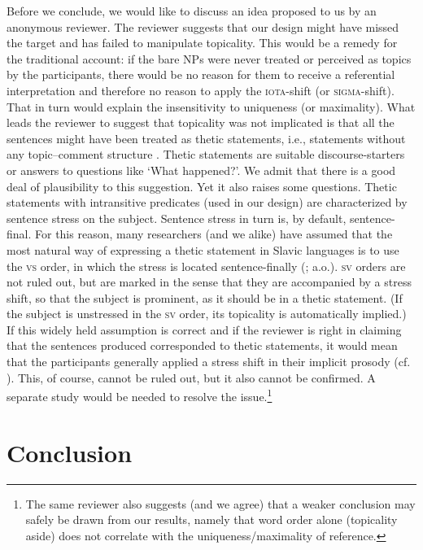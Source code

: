 \documentclass[output=paper]{langscibook}
\begin{document}
Before we conclude, we would like to discuss an idea proposed to us by an anonymous reviewer. The reviewer suggests that our design might have missed the target and has failed to manipulate topicality. This would be a remedy for the traditional account: if the bare NPs were never treated or perceived as topics by the participants, there would be no reason for them to receive a referential interpretation and therefore no reason to apply the \textsc{iota}-shift (or \textsc{sigma}-shift). That in turn would explain the insensitivity to uniqueness (or maximality). What leads the reviewer to suggest that topicality was not implicated is that all the sentences might have been treated as thetic statements, i.e., statements without any topic--comment structure \citep{Sasse1987}. Thetic statements are suitable discourse-starters or answers to questions like `What happened?'. We admit that there is a good deal of plausibility to this suggestion. Yet it also raises some questions. Thetic statements with intransitive predicates (used in our design) are characterized by sentence stress on the subject. Sentence stress in turn is, by default, sentence-final. For this reason, many researchers (and we alike) have assumed that the most natural way of expressing a thetic statement in Slavic languages is to use the \textsc{vs} order, in which the stress is located sentence-finally (\citealt{Junghanns2002,Geist2010}; a.o.). \textsc{sv} orders are not ruled out, but are marked in the sense that they are accompanied by a stress shift, so that the subject is prominent, as it should be in a thetic statement. (If the subject is unstressed in the \textsc{sv} order, its topicality is automatically implied.) If this widely held assumption is correct and if the reviewer is right in claiming that the sentences produced corresponded to thetic statements, it would mean that the participants generally applied a stress shift in their implicit prosody (cf. \citealt{Fodor2002}). This, of course, cannot be ruled out, but it also cannot be confirmed. A separate study would be needed to resolve the issue.\footnote{The same reviewer also suggests (and we agree) that a weaker conclusion may safely be drawn from our results, namely that word order alone (topicality aside) does not correlate with the uniqueness/maximality of reference.\label{sim-dem:fn:thetic}}

\section{Conclusion}\label{sim-dem:sec:concl}
\end{document}
